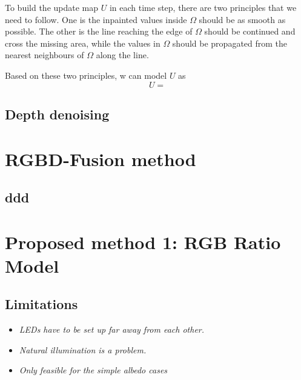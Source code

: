 To build the update map $U$ in each time step, there are two principles that we need to follow.
One is the inpainted values inside $\Omega$ should be as smooth as possible. 
The other is the line reaching the edge of $\Omega$ should be continued and cross the missing area, while the values in $\Omega$ should be propagated from the nearest neighbours of $\Omega$ along the line.

Based on these two principles, w can model $U$ as
\begin{equation}
U = 
\end{equation}

\subsection{Depth denoising}


\section{RGBD-Fusion method}

\subsection{ddd}


\section{Proposed method 1: RGB Ratio Model}



\subsection{Limitations}
\begin{itemize}
\item \emph{LEDs have to be set up far away from each other.}
\item \emph{Natural illumination is a problem.}
\item \emph{Only feasible for the simple albedo cases}
\end{itemize}


